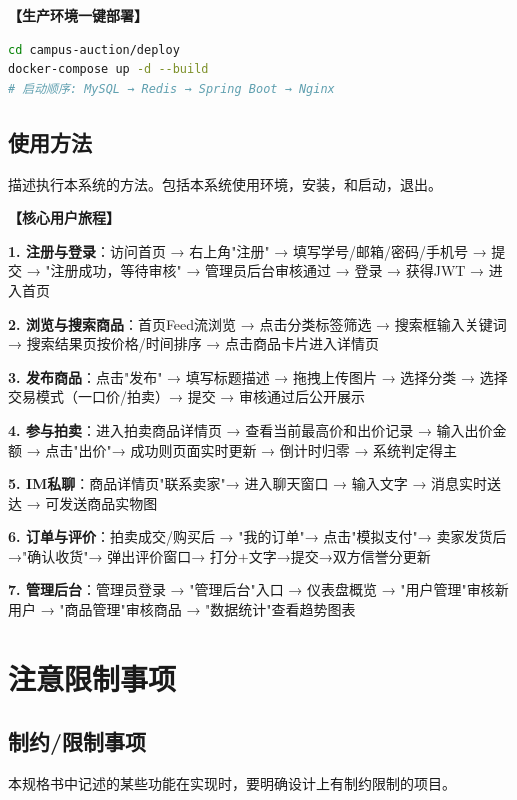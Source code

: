 \documentclass[12pt,a4paper]{ctexart}
\numberwithin{figure}{section}
\numberwithin{table}{section}
\begin{document}
\textbf{【生产环境一键部署】}

\begin{lstlisting}[language=bash]
cd campus-auction/deploy
docker-compose up -d --build
# 启动顺序: MySQL → Redis → Spring Boot → Nginx
\end{lstlisting}

\subsection{使用方法}

描述执行本系统的方法。包括本系统使用环境，安装，和启动，退出。

\textbf{【核心用户旅程】}

\textbf{1. 注册与登录}：访问首页 → 右上角"注册" → 填写学号/邮箱/密码/手机号 → 提交 → "注册成功，等待审核" → 管理员后台审核通过 → 登录 → 获得JWT → 进入首页

\textbf{2. 浏览与搜索商品}：首页Feed流浏览 → 点击分类标签筛选 → 搜索框输入关键词 → 搜索结果页按价格/时间排序 → 点击商品卡片进入详情页

\textbf{3. 发布商品}：点击"发布" → 填写标题描述 → 拖拽上传图片 → 选择分类 → 选择交易模式（一口价/拍卖）→ 提交 → 审核通过后公开展示

\textbf{4. 参与拍卖}：进入拍卖商品详情页 → 查看当前最高价和出价记录 → 输入出价金额 → 点击"出价"→ 成功则页面实时更新 → 倒计时归零 → 系统判定得主

\textbf{5. IM私聊}：商品详情页"联系卖家"→ 进入聊天窗口 → 输入文字 → 消息实时送达 → 可发送商品实物图

\textbf{6. 订单与评价}：拍卖成交/购买后 → "我的订单"→ 点击"模拟支付"→ 卖家发货后→"确认收货"→ 弹出评价窗口→ 打分+文字→提交→双方信誉分更新

\textbf{7. 管理后台}：管理员登录 → "管理后台"入口 → 仪表盘概览 → "用户管理"审核新用户 → "商品管理"审核商品 → "数据统计"查看趋势图表

\section{注意限制事项}

\subsection{制约/限制事项}

本规格书中记述的某些功能在实现时，要明确设计上有制约限制的项目。
\end{document}
